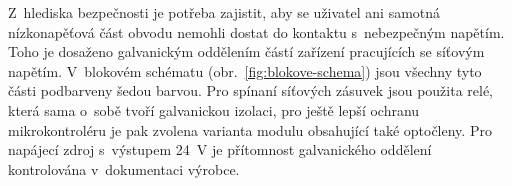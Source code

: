     Z~hlediska bezpečnosti je potřeba zajistit, aby se uživatel ani samotná nízkonapěťová část obvodu nemohli dostat do kontaktu s~nebezpečným napětím. Toho je dosaženo galvanickým oddělením částí zařízení pracujících se síťovým napětím. V~blokovém schématu (obr.~\ref{fig:blokove-schema}) jsou všechny tyto části podbarveny šedou barvou. Pro spínaní síťových zásuvek jsou použita relé, která sama o~sobě tvoří galvanickou izolaci, pro ještě lepší ochranu mikrokontroléru je pak zvolena varianta modulu obsahující také optočleny. Pro napájecí zdroj s~výstupem \qty{24}{V} je přítomnost galvanického oddělení kontrolována v~dokumentaci výrobce. 
    


    
    

